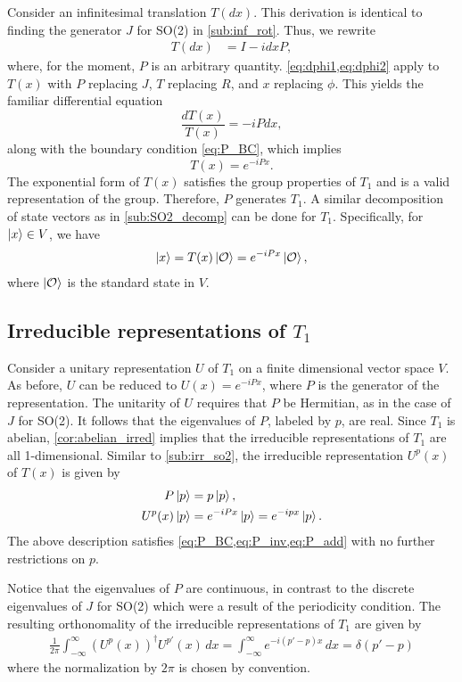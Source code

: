 Consider an infinitesimal translation $T(dx)$. This derivation is identical to finding the generator $J$ for SO(2) in \cref{sub:inf_rot}. Thus, we rewrite
\begin{align*}
    T(dx) &= I - i dx P,
\end{align*}
where, for the moment, $P$ is an arbitrary quantity. \cref{eq:dphi1,eq:dphi2} apply to $T(x)$ with $P$ replacing $J$, $T$ replacing $R$, and $x$ replacing $\phi$. This yields the familiar differential equation
\begin{equation}
    \frac{dT(x)}{T(x)} = -iP dx,
\end{equation}
along with the boundary condition \cref{eq:P_BC}, which implies
\begin{equation}
    T(x) = e^{-iPx}.
\end{equation}
The exponential form of $T(x)$ satisfies the group properties of $T_1$ and is a valid representation of the group. Therefore, $P$ generates $T_1$. A similar decomposition of state vectors as in \cref{sub:SO2_decomp} can be done for $T_1$. Specifically, for $\ket{x}\in V$, we have
\begin{align*}
    \ket{x} = T(x)\ket{\mathcal{O}} = e^{-iPx}\ket{\mathcal{O}},
\end{align*}
where $\ket{\mathcal{O}}$ is the standard state in $V$.

\subsection{Irreducible representations of $T_1$}
Consider a unitary representation $U$ of $T_1$ on a finite dimensional vector space $V$. As before, $U$ can be reduced to $U(x) = e^{-iPx}$, where $P$ is the generator of the representation. The unitarity of $U$ requires that $P$ be Hermitian, as in the case of $J$ for SO(2). It follows that the eigenvalues of $P$, labeled by $p$, are real. Since $T_1$ is abelian, \cref{cor:abelian_irred} implies that the irreducible representations of $T_1$ are all 1-dimensional. Similar to \cref{sub:irr_so2}, the irreducible representation $U^p(x)$ of $T(x)$ is given by
\begin{align*}
    P\ket{p} &= p\ket{p}, \\
    U^p(x)\ket{p} &= e^{-iPx}\ket{p} = e^{-ip x}\ket{p}.
\end{align*}
The above description satisfies \cref{eq:P_BC,eq:P_inv,eq:P_add} with no further restrictions on $p$. 

Notice that the eigenvalues of $P$ are continuous, in contrast to the discrete eigenvalues of $J$ for SO(2) which were a result of the periodicity condition. The resulting orthonomality of the irreducible representations of $T_1$ are given by
\begin{align*}
    \frac{1}{2\pi}\int_{-\infty}^{\infty} {(U^p(x))}^\dagger U^{p'}(x) \,dx = \int_{-\infty}^{\infty} e^{-i(p'-p)x} \,dx = \delta(p'-p)
\end{align*}
where the normalization by $2\pi$ is chosen by convention.

